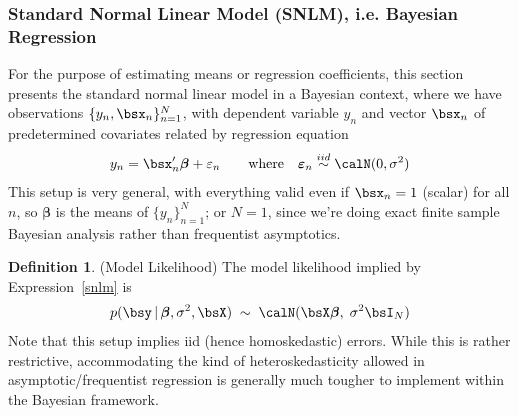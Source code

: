 \documentclass[12pt]{article}
\theoremstyle{plain}
\theoremstyle{definition}
\newtheorem{defn}[thm]{Definition}
\theoremstyle{remark}
\newcommand{\bsSigma}{\boldsymbol{\Sigma}}
\newcommand{\bsvarepsilon}{\boldsymbol{\varepsilon}}
\newcommand{\bsbeta}{\boldsymbol{\beta}}
\newcommand{\iid}{\overset{iid}{\sim}}
\newcommand{\prodnN}{\prod^N_{n=1}}
\newcommand{\nN}{_{n=1}^N}
\begin{document}
\clearpage
\subsubsection{Standard Normal Linear Model (SNLM), i.e. Bayesian Regression}

For the purpose of estimating means or regression coefficients, this
section presents the standard normal linear model in a Bayesian
context, where we have observations $\{y_n,\bsx_n\}\nN$, with
dependent variable $y_n$ and vector $\bsx_n$ of predetermined covariates
related by regression equation
\begin{align}
  y_n
  =
  \bsx_n'\bsbeta
  + \varepsilon_n
  \qquad\text{where}\quad
  \bsvarepsilon_n\iid\calN(0,\sigma^2)
  \label{snlm}
\end{align}
This setup is very general, with everything valid even if
$\bsx_n=1$ (scalar) for all $n$, so $\bsbeta$ is the means of
$\{y_n\}\nN$; or $N=1$, since we're doing exact finite sample
Bayesian analysis rather than frequentist asymptotics.


\begin{defn}(Model Likelihood)
The model likelihood implied by Expression~\ref{snlm} is
\begin{align*}
  p(\bsy\,|\,\bsbeta,\sigma^2,\bsX)
  \;\sim\;\calN(\bsX\bsbeta,\;\sigma^2 \bsI_N)
\end{align*}
Note that this setup implies iid (hence homoskedastic) errors.
While this is rather restrictive, accommodating the kind of
heteroskedasticity allowed in asymptotic/frequentist regression is
generally much tougher to implement within the Bayesian framework.
\end{defn}
\end{document}
